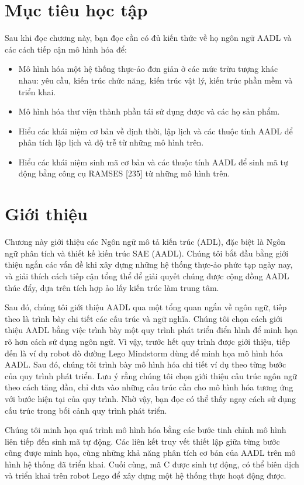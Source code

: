 \section{Mục tiêu học tập}
Sau khi đọc chương này, bạn đọc cần có đủ kiến thức về họ ngôn ngữ AADL và các cách tiếp cận mô hình hóa để:
\begin{itemize}
\item Mô hình hóa một hệ thống thực-ảo đơn giản ở các mức trừu tượng khác nhau: yêu cầu, kiến trúc chức năng, kiến trúc vật lý, kiến trúc phần mềm và triển khai.
\item Mô hình hóa thư viện thành phần tái sử dụng được và các họ sản phẩm.
\item Hiểu các khái niệm cơ bản về định thời, lập lịch và các thuộc tính AADL để phân tích lập lịch và độ trễ từ những mô hình trên.
\item Hiểu các khái niệm sinh mã cơ bản và các thuộc tính AADL để sinh mã tự động bằng công cụ RAMSES [235] từ những mô hình trên.
\end{itemize}

\section{Giới thiệu}
Chương này giới thiệu các Ngôn ngữ mô tả kiến trúc (ADL), đặc biệt là Ngôn ngữ phân tích và thiết kế kiến trúc SAE (AADL). Chúng tôi bắt đầu bằng giới thiệu ngắn các vấn đề khi xây dựng những hệ thống thực-ảo phức tạp ngày nay, và giải thích cách tiếp cận tổng thể để giải quyết chúng được cộng đồng AADL thúc đẩy, dựa trên tích hợp ảo lấy kiến trúc làm trung tâm.

Sau đó, chúng tôi giới thiệu AADL qua một tổng quan ngắn về ngôn ngữ, tiếp theo là trình bày chi tiết các cấu trúc và ngữ nghĩa. Chúng tôi chọn cách giới thiệu AADL bằng việc trình bày một
quy trình phát triển điển hình để minh họa rõ hơn cách sử dụng ngôn ngữ. Vì vậy, trước hết quy trình được giới thiệu, tiếp đến là ví dụ robot dò đường Lego Mindstorm dùng để minh họa mô hình hóa AADL. Sau đó, chúng tôi trình bày mô hình hóa chi tiết ví dụ theo từng bước của quy trình phát triển. Lưu ý rằng chúng tôi chọn giới thiệu cấu trúc ngôn ngữ theo cách tăng dần, chỉ đưa vào những cấu trúc cần cho mô hình hóa tương ứng với bước hiện tại của quy trình. Nhờ vậy, bạn đọc có thể thấy ngay cách sử dụng cấu trúc trong bối cảnh quy trình phát triển.

Chúng tôi minh họa quá trình mô hình hóa bằng các bước tinh chỉnh mô hình liên tiếp đến sinh mã tự động. Các liên kết truy vết thiết lập giữa từng bước cũng được minh họa, cùng những khả năng phân tích cơ bản của AADL trên mô hình hệ thống đã triển khai. Cuối cùng, mã C được sinh tự động, có thể biên dịch và triển khai trên robot Lego để xây dựng một hệ thống thực hoạt động được.

